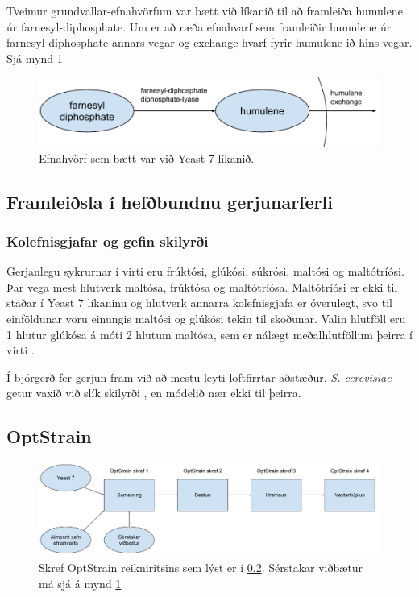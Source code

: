 \documentclass[12pt]{article}
\begin{document}
Tveimur grundvallar-efnahvörfum var bætt við líkanið til að framleiða humulene úr farnesyl-diphosphate.
Um er að ræða efnahvarf sem framleiðir humulene úr farnesyl-diphosphate annars vegar og exchange-hvarf fyrir humulene-ið hins vegar. Sjá mynd \ref{fig:pathway}

\begin{figure}
\caption[Viðbætur við Yeast 7]{Efnahvörf sem bætt var við Yeast 7 líkanið.}
\label{fig:pathway}
\includegraphics[width=\textwidth]{Pics/HumuleneAddition}
\end{figure}
\subsection{Framleiðsla í hefðbundnu gerjunarferli}
\label{sec:hefdbundid}
\subsubsection{Kolefnisgjafar og gefin skilyrði}
Gerjanlegu sykrurnar í virti eru frúktósi, glúkósi, súkrósi, maltósi og maltótríósi. Þar vega mest hlutverk maltósa, frúktósa og maltótríósa. Maltótríósi er ekki til staðar í Yeast 7 líkaninu og hlutverk annarra kolefnisgjafa er óverulegt, svo til einföldunar voru einungis maltósi og glúkósi tekin til skoðunar. Valin hlutföll eru 1 hlutur glúkósa á móti 2 hlutum maltósa, sem er nálægt meðalhlutföllum þeirra í virti \cite{otter1967determination}. 

Í bjórgerð fer gerjun fram við að mestu leyti loftfirrtar aðstæður. \emph{S. cerevisiae} getur vaxið við slík skilyrði \cite{ishtar2007factors}, en módelið nær ekki til þeirra.
\subsection{OptStrain}
\label{sec:optstrain}
\begin{figure}
\caption[OptStrain reikniritið]{Skref OptStrain reikniritsins sem lýst er í \ref{sec:optstrain}. Sérstakar viðbætur má sjá á mynd \ref{fig:pathway}}
\label{fig:flaedirit}
\includegraphics[width=\textwidth]{Pics/OptStrainOverview}
\end{figure}
\end{document}
